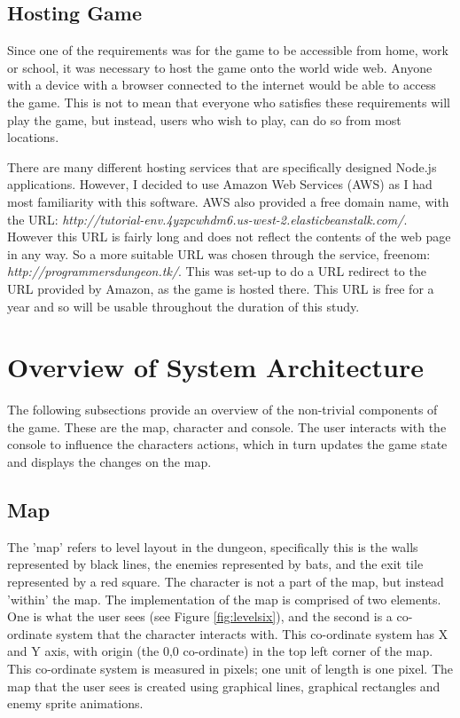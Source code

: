 \documentclass[a4paper,11.5pt]{report}
\numberwithin{figure}{section}
\numberwithin{table}{section}
\numberwithin{equation}{section}
\numberwithin{equation}{section}
\begin{document}
\subsection{Hosting Game}

Since one of the requirements was for the game to be accessible from home, work or school, it was necessary to host the game onto the world wide web. Anyone with a device with a browser connected to the internet would be able to access the game. This is not to mean that everyone who satisfies these requirements will play the game, but instead, users who wish to play, can do so from most locations.

There are many different hosting services that are specifically designed Node.js applications. However, I decided to use Amazon Web Services (AWS) as I had most familiarity with this software. AWS also provided a free domain name, with the URL: \textit{http://tutorial-env.4yzpcwhdm6.us-west-2.elasticbeanstalk.com/}. However this URL is fairly long and does not reflect the contents of the web page in any way. So a more suitable URL was chosen through the service, freenom: \textit{http://programmersdungeon.tk/}. This was set-up to do a URL redirect to the URL provided by Amazon, as the game is hosted there. This URL is free for a year and so will be usable throughout the duration of this study. 


\section{Overview of System Architecture}

The following subsections provide an overview of the non-trivial components of the game. These are the map, character and console. The user interacts with the console to influence the characters actions, which in turn updates the game state and displays the changes on the map.

\subsection{Map}

The 'map' refers to level layout in the dungeon, specifically this is the walls represented by black lines, the enemies represented by bats, and the exit tile represented by a red square. The character is not a part of the map, but instead 'within' the map. The implementation of the map is comprised of two elements. One is what the user sees (see Figure \ref{fig:levelsix}), and the second is a co-ordinate system that the character interacts with. This co-ordinate system has X and Y axis, with origin (the 0,0 co-ordinate) in the top left corner of the map. This co-ordinate system is measured in pixels; one unit of length is one pixel. The map that the user sees is created using graphical lines, graphical rectangles and enemy sprite animations.
\end{document}
